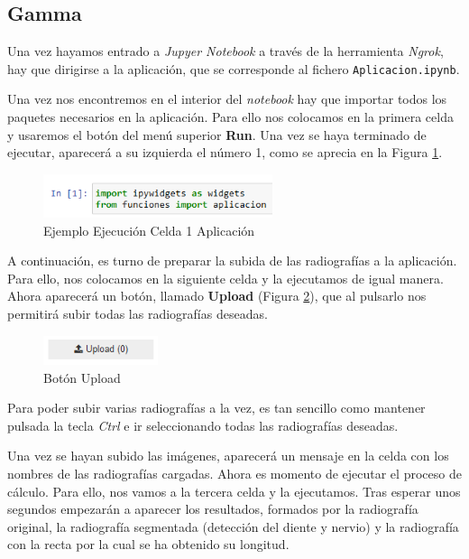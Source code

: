 \subsection{Gamma}
Una vez hayamos entrado a \emph{Jupyer Notebook} a través de la herramienta \emph{Ngrok}, hay que dirigirse a la aplicación, que se corresponde al fichero \texttt{Aplicacion.ipynb}.

Una vez nos encontremos en el interior del \emph{notebook} hay que importar todos los paquetes necesarios en la aplicación. Para ello nos colocamos en la primera celda y usaremos el botón del menú superior \textbf{Run}. Una vez se haya terminado de ejecutar, aparecerá a su izquierda el número 1, como se aprecia en la Figura \ref{f:celda1}.

\begin{figure}[h]
 \centering
  \includegraphics[width=0.6\textwidth]{img/Gamma1.PNG}
 \caption{Ejemplo Ejecución Celda 1 Aplicación}
 \label{f:celda1}
\end{figure}

A continuación, es turno de preparar la subida de las radiografías a la aplicación. Para ello, nos colocamos en la siguiente celda y la ejecutamos de igual manera. Ahora aparecerá un botón, llamado \textbf{Upload} (Figura \ref{f:upload}), que al pulsarlo nos permitirá subir todas las radiografías deseadas.

\begin{figure}[h]
 \centering
  \includegraphics[width=0.3\textwidth]{img/Gamma2.PNG}
 \caption{Botón Upload}
 \label{f:upload}
\end{figure}

Para poder subir varias radiografías a la vez, es tan sencillo como mantener pulsada la tecla \emph{Ctrl} e ir seleccionando todas las radiografías deseadas.

Una vez se hayan subido las imágenes, aparecerá un mensaje en la celda con los nombres de las radiografías cargadas. Ahora es momento de ejecutar el proceso de cálculo. Para ello, nos vamos a la tercera celda y la ejecutamos. Tras esperar unos segundos empezarán a aparecer los resultados, formados por la radiografía original, la radiografía segmentada (detección del diente y nervio) y la radiografía con la recta por la cual se ha obtenido su longitud.

